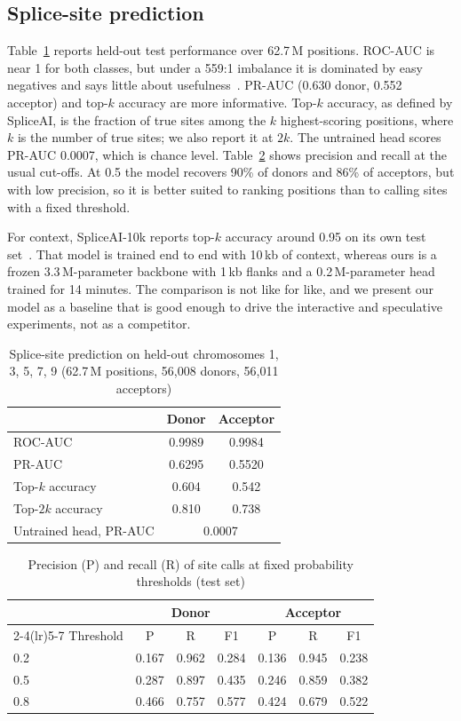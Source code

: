 \documentclass[conference]{IEEEtran}
\begin{document}
\subsection{Splice-site prediction}
Table~\ref{tab:pred} reports held-out test performance over 62.7\,M positions. ROC-AUC is near 1 for both classes, but under a 559:1 imbalance it is dominated by easy negatives and says little about usefulness~\cite{saito2015prc}. PR-AUC (0.630 donor, 0.552 acceptor) and top-$k$ accuracy are more informative. Top-$k$ accuracy, as defined by SpliceAI, is the fraction of true sites among the $k$ highest-scoring positions, where $k$ is the number of true sites; we also report it at $2k$. The untrained head scores PR-AUC 0.0007, which is chance level. Table~\ref{tab:thresh} shows precision and recall at the usual cut-offs. At 0.5 the model recovers 90\% of donors and 86\% of acceptors, but with low precision, so it is better suited to ranking positions than to calling sites with a fixed threshold.

For context, SpliceAI-10k reports top-$k$ accuracy around 0.95 on its own test set~\cite{jaganathan2019spliceai}. That model is trained end to end with 10\,kb of context, whereas ours is a frozen 3.3\,M-parameter backbone with 1\,kb flanks and a 0.2\,M-parameter head trained for 14 minutes. The comparison is not like for like, and we present our model as a baseline that is good enough to drive the interactive and speculative experiments, not as a competitor.

\begin{table}[t]
\centering
\caption{Splice-site prediction on held-out chromosomes 1, 3, 5, 7, 9 (62.7\,M positions, 56{,}008 donors, 56{,}011 acceptors)}
\label{tab:pred}
\begin{tabular}{lcc}
\toprule
 & Donor & Acceptor \\
\midrule
ROC-AUC & 0.9989 & 0.9984 \\
PR-AUC & 0.6295 & 0.5520 \\
Top-$k$ accuracy & 0.604 & 0.542 \\
Top-$2k$ accuracy & 0.810 & 0.738 \\
\midrule
Untrained head, PR-AUC & \multicolumn{2}{c}{0.0007} \\
\bottomrule
\end{tabular}
\end{table}

\begin{table}[t]
\centering
\caption{Precision (P) and recall (R) of site calls at fixed probability thresholds (test set)}
\label{tab:thresh}
\begin{tabular}{lcccccc}
\toprule
 & \multicolumn{3}{c}{Donor} & \multicolumn{3}{c}{Acceptor} \\
\cmidrule(lr){2-4}\cmidrule(lr){5-7}
Threshold & P & R & F1 & P & R & F1 \\
\midrule
0.2 & 0.167 & 0.962 & 0.284 & 0.136 & 0.945 & 0.238 \\
0.5 & 0.287 & 0.897 & 0.435 & 0.246 & 0.859 & 0.382 \\
0.8 & 0.466 & 0.757 & 0.577 & 0.424 & 0.679 & 0.522 \\
\bottomrule
\end{tabular}
\end{table}
\end{document}
